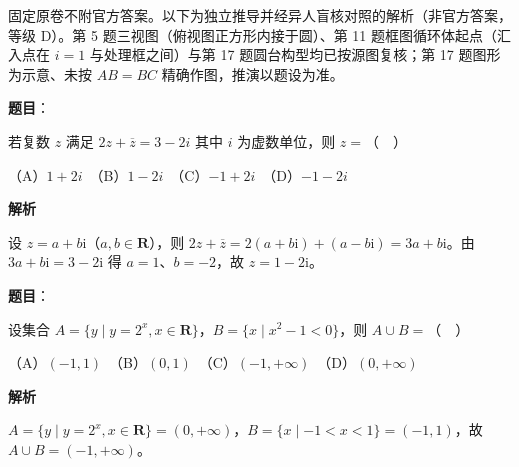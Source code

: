 

\begin{gktip}
固定原卷不附官方答案。以下为独立推导并经异人盲核对照的解析（非官方答案，等级 D）。第 5 题三视图（俯视图正方形内接于圆）、第 11 题框图循环体起点（汇入点在 \(i=1\) 与处理框之间）与第 17 题圆台构型均已按源图复核；第 17 题图形为示意、未按 \(AB=BC\) 精确作图，推演以题设为准。
\end{gktip}

\begin{answer}

\textbf{题目}：

若复数 \(z\) 满足 \(2z+\overline{z}=3-2i\) 其中 \(i\) 为虚数单位，则 \(z=\)（　）

（A）\(1+2i\)　（B）\(1-2i\)　（C）\(-1+2i\)　（D）\(-1-2i\)

\textbf{解析}

设 \(z=a+b\mathrm{i}\)（\(a,b\in\mathbf{R}\)），则 \(2z+\overline{z}=2(a+b\mathrm{i})+(a-b\mathrm{i})=3a+b\mathrm{i}\)。由 \(3a+b\mathrm{i}=3-2\mathrm{i}\) 得 \(a=1\)、\(b=-2\)，故 \(z=1-2\mathrm{i}\)。


\end{answer}
\begin{answer}

\textbf{题目}：

设集合 \(A=\{y\mid y=2^{x},x\in\mathbf{R}\}\)，\(B=\{x\mid x^{2}-1<0\}\)，则 \(A\cup B=\)（　）

（A）\((-1,1)\)　（B）\((0,1)\)　（C）\((-1,+\infty)\)　（D）\((0,+\infty)\)

\textbf{解析}

\(A=\{y\mid y=2^{x},x\in\mathbf{R}\}=(0,+\infty)\)，\(B=\{x\mid -1<x<1\}=(-1,1)\)，故 \(A\cup B=(-1,+\infty)\)。


\end{answer}

